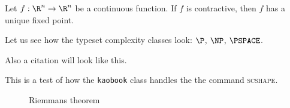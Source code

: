 \begin{theorem}\label{thm:fixed_point}
    Let $f: \R^n \to \R^n$ be a continuous function. If $f$ is
    contractive, then $f$ has a unique fixed point.
\end{theorem}
Let us see how the typeset complexity classes look: $\P$, $\NP$, $\PSPACE$.

Also a citation
 will look like this.

This is a test of how the \texttt{kaobook} class handles the the command
\textsc{scshape}.

\begin{figure}[ht]
    \centering
    \caption{Riemmans theorem}
    \label{fig:riemmans-theorem}
\end{figure}